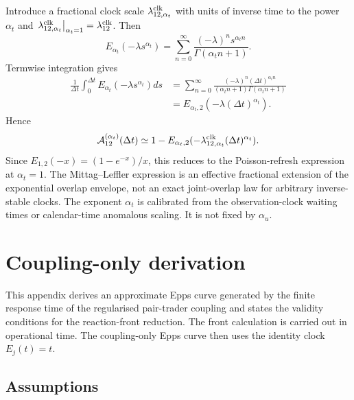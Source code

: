 \documentclass[5p,final]{elsarticle}
\begin{document}
Introduce a fractional clock scale $\lambda_{12,\alpha_t}^{\rm clk}$ with units of inverse time to the power $\alpha_t$ and $\left.\lambda_{12,\alpha_t}^{\rm clk}\right|_{\alpha_t=1}=\lambda_{12}^{\rm clk}$. Then
\begin{equation}
    E_{\alpha_t}(-\lambda s^{\alpha_t})
    =\sum_{n=0}^{\infty}
    \frac{(-\lambda)^ns^{\alpha_t n}}
    {\Gamma(\alpha_t n+1)}.
\end{equation}
Termwise integration gives
\begin{align}
    \frac{1}{\Delta t}\int_0^{\Delta t}
    E_{\alpha_t}(-\lambda s^{\alpha_t})ds
    &=\sum_{n=0}^{\infty}
    \frac{(-\lambda)^n(\Delta t)^{\alpha_t n}}
    {(\alpha_t n+1)\Gamma(\alpha_t n+1)}\\
    &=E_{\alpha_t,2}(-\lambda(\Delta t)^{\alpha_t}).
\end{align}
Hence
\begin{equation}
    \mathcal A_{12}^{(\alpha_t)}(\Delta t)
    \simeq
    1-E_{\alpha_t,2}(-\lambda_{12,\alpha_t}^{\rm clk}(\Delta t)^{\alpha_t}).
\end{equation}
Since $E_{1,2}(-x)=(1-e^{-x})/x$, this reduces to the Poisson-refresh expression at $\alpha_t=1$. The Mittag--Leffler expression is an effective fractional extension of the exponential overlap envelope, not an exact joint-overlap law for arbitrary inverse-stable clocks. The exponent $\alpha_t$ is calibrated from the observation-clock waiting times or calendar-time anomalous scaling. It is not fixed by $\alpha_u$.

\section{Coupling-only derivation}
\label{app:coupling-only}

This appendix derives an approximate Epps curve generated by the finite response time of the regularised pair-trader coupling and states the validity conditions for the reaction-front reduction. The front calculation is carried out in operational time. The coupling-only Epps curve then uses the identity clock $E_j(t)=t$.

\subsection{Assumptions}
\end{document}

